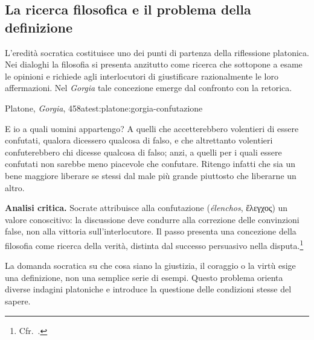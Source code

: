 \subsection{La ricerca filosofica e il problema della definizione}

L'eredità socratica costituisce uno dei punti di partenza della riflessione platonica. Nei dialoghi la filosofia si presenta anzitutto come ricerca che sottopone a esame le opinioni e richiede agli interlocutori di giustificare razionalmente le loro affermazioni. Nel \emph{Gorgia} tale concezione emerge dal confronto con la retorica.

\begin{testimonianza}{Platone, \emph{Gorgia}, 458a}{test:platone:gorgia-confutazione}
\smallskip
{}\par
E io a quali uomini appartengo? A quelli che accetterebbero volentieri di essere confutati, qualora dicessero qualcosa di falso, e che altrettanto volentieri confuterebbero chi dicesse qualcosa di falso; anzi, a quelli per i quali essere confutati non sarebbe meno piacevole che confutare. Ritengo infatti che sia un bene maggiore liberare se stessi dal male più grande piuttosto che liberarne un altro.
\end{testimonianza}


\noindent\textbf{Analisi critica.}
Socrate attribuisce alla confutazione (\emph{élenchos}, ἔλεγχος) un valore conoscitivo: la discussione deve condurre alla correzione delle convinzioni false, non alla vittoria sull'interlocutore. Il passo presenta una concezione della filosofia come ricerca della verità, distinta dal successo persuasivo nella disputa.\footnote{Cfr.\ \cite[97--98]{palumbo2015}.}

La domanda socratica su che cosa siano la giustizia, il coraggio o la virtù esige una definizione, non una semplice serie di esempi. Questo problema orienta diverse indagini platoniche e introduce la questione delle condizioni stesse del sapere.

